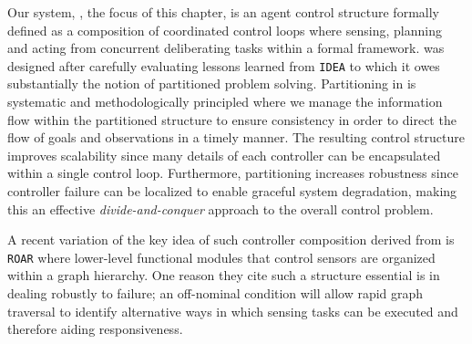 Our system, \rxe, the focus of this chapter, is an agent control
structure formally defined as a composition of coordinated control
loops where sensing, planning and acting  from
concurrent deliberating tasks within a formal framework.  \rx was
designed after carefully evaluating lessons learned from \texttt{IDEA}
to which it owes substantially the notion of partitioned problem
solving. Partitioning in \rx is systematic and methodologically
principled where we manage the information flow within the partitioned
structure to ensure consistency in order to direct the flow of goals
and observations in a timely manner. The resulting control structure
improves scalability since many details of each controller can be
encapsulated within a single control loop.  Furthermore, partitioning
increases robustness since controller failure can be localized to
enable graceful system degradation, making this an effective
\emph{divide-and-conquer} approach to  the overall
control problem.

A recent variation of the key idea of such controller composition
derived from \rx is \texttt{ROAR} \cite{degroote11} where lower-level
functional modules that control sensors are organized within a graph
hierarchy. One reason they cite such a structure 
essential is in dealing robustly to failure; an off-nominal condition
will allow rapid graph traversal to identify alternative ways in which
sensing tasks can be executed and therefore aiding 
responsiveness. %


